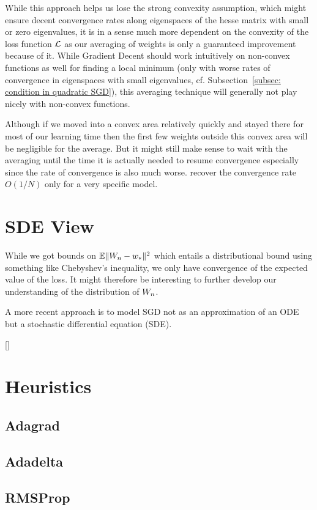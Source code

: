 While this approach helps us lose the strong convexity assumption, which might
ensure decent convergence rates along eigenspaces of the hesse matrix with
small or zero eigenvalues, it is in a sense much more dependent on the convexity
of the loss function \(\mathcal{L}\) as our averaging of weights is only a
guaranteed improvement because of it. While Gradient Decent should work
intuitively on non-convex functions as well for finding a local minimum (only with
worse rates of convergence in eigenspaces with small eigenvalues, cf.
Subsection~\ref{subsec: condition in quadratic SGD}), this averaging technique
will generally not play nicely with non-convex functions.

Although if we moved into a convex area relatively quickly and stayed there for
most of our learning time then the first few weights outside this convex
area will be negligible for the average.
But it might still make sense to wait with the averaging until the time it is
actually needed to resume convergence especially since the rate of convergence
is also much worse. \textcite{bachNonstronglyconvexSmoothStochastic2013}
recover the convergence rate \(O(1/N)\) only for a very specific model.

\section{SDE View}

While we got bounds on \(\mathbb{E}\|W_n - w_*\|^2\) which entails a
distributional bound using something like Chebyshev's inequality, we only
have convergence of the expected value of the loss. It might therefore be
interesting to further develop our understanding of the distribution of \(W_n\).

A more recent approach is to model SGD not as an approximation of an ODE but a
stochastic differential equation (SDE).


[\textcite{simsekliTailIndexAnalysisStochastic2019}]


\section{Heuristics}

\subsection{Adagrad}

\subsection{Adadelta}

\subsection{RMSProp}


\endinput
